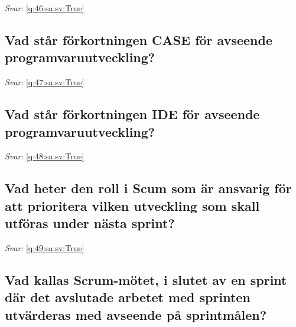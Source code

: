 \documentclass[a4paper,11pt,oneside]{article}
\begin{document}
\begin{sloppypar}
\vspace{1cm}

\textit{Svar}: \autoref{q:46:sa:sv:True}



\subsection{Vad st\r{a}r f\"orkortningen CASE f\"or avseende programvaruutveckling?}

\label{q:47:sa:sv:False}

\vspace{2cm}

\noindent\makebox[\textwidth]{\hrulefill}

\vspace{1cm}

\textit{Svar}: \autoref{q:47:sa:sv:True}



\subsection{Vad st\r{a}r f\"orkortningen IDE f\"or avseende programvaruutveckling?}

\label{q:48:sa:sv:False}

\vspace{2cm}

\noindent\makebox[\textwidth]{\hrulefill}

\vspace{1cm}

\textit{Svar}: \autoref{q:48:sa:sv:True}



\subsection{Vad heter den roll i Scum som \"ar ansvarig f\"or att prioritera vilken utveckling som skall utf\"oras under n\"asta sprint?}

\label{q:49:sa:sv:False}

\vspace{2cm}

\noindent\makebox[\textwidth]{\hrulefill}

\vspace{1cm}

\textit{Svar}: \autoref{q:49:sa:sv:True}



\subsection{Vad kallas Scrum-m\"otet, i slutet av en sprint d\"ar det avslutade arbetet med sprinten utv\"arderas med avseende p\r{a} sprintm\r{a}len?}


\end{sloppypar}
\end{document}
